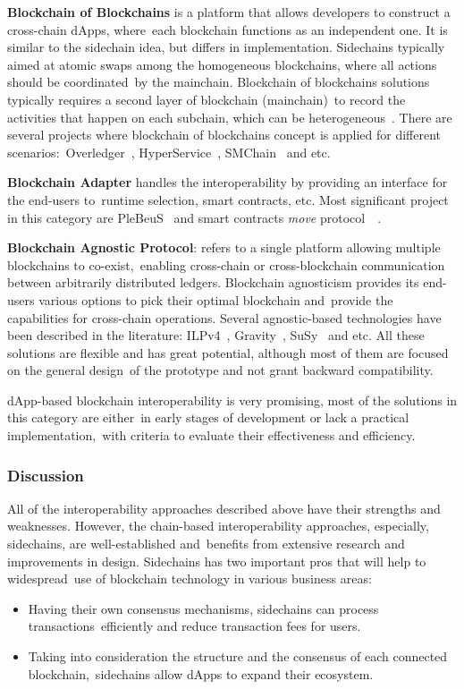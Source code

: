 \textbf{Blockchain of Blockchains} is a platform that allows developers to construct a cross-chain dApps, where\
each blockchain functions as an independent one.
It is similar to the sidechain idea, but differs in implementation.
Sidechains typically aimed at atomic swaps among the homogeneous blockchains, where all actions should be coordinated\
by the mainchain.
Blockchain of blockchains solutions typically requires a second layer of blockchain (mainchain)\
to record the activities that happen on each subchain, which can be heterogeneous~\cite{cryptoeprint:2021/537}.
There are several projects where blockchain of blockchains concept is applied for different scenarios:\
Overledger~\cite{Verdian2018}, HyperService~\cite{Liu2019}, SMChain~\cite{cryptoeprint:2019/1401} and etc.

\textbf{Blockchain Adapter} handles the interoperability by providing an interface for the end-users to\
runtime selection, smart contracts, etc.
Most significant project in this category are PleBeuS~\cite{Scheid2020} and smart contracts \emph{move} protocol\
~\cite{Fynn2020}.

\textbf{Blockchain Agnostic Protocol}: refers to a single platform allowing multiple blockchains to co-exist,\
enabling cross-chain or cross-blockchain communication between arbitrarily distributed ledgers.
Blockchain agnosticism provides its end-users various options to pick their optimal blockchain and\
provide the capabilities for cross-chain operations.
Several agnostic-based technologies have been described in the literature: ILPv4~\cite{InterledgerV4},
Gravity~\cite{PupyshevGravity2020}, SuSy~\cite{PupyshevSuSy2020} and etc.
All these solutions are flexible and has great potential, although most of them are focused on the general design\
of the prototype and not grant backward compatibility.

dApp-based blockchain interoperability is very promising, most of the solutions in this category are either\
in early stages of development or lack a practical implementation,\
with criteria to evaluate their effectiveness and efficiency.

\subsubsection{Discussion}

All of the interoperability approaches described above have their strengths and weaknesses.
However, the chain-based interoperability approaches, especially, sidechains, are well-established and\
benefits from extensive research and improvements in design.
Sidechains has two important pros that will help to widespread\
use of blockchain technology in various business areas:
\begin{itemize}
    \item Having their own consensus mechanisms, sidechains can process transactions\
    efficiently and reduce transaction fees for users.
    \item Taking into consideration the structure and the consensus of each connected blockchain,\
    sidechains allow dApps to expand their ecosystem.
\end{itemize}

